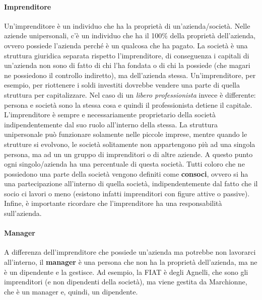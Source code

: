 \paragraph*{Imprenditore} Un'imprenditore è un individuo che ha la
proprietà di un'azienda/società. Nelle aziende unipersonali, c'è un individuo
che ha il 100\% della proprietà dell'azienda, ovvero possiede l'azienda perché
è un qualcosa che ha pagato. La società è una struttura giuridica separata
rispetto l'imprenditore, di conseguenza i capitali di un'azienda non sono di
fatto di chi l'ha fondata o di chi la possiede (che magari ne possiedono il
controllo indiretto), ma dell'azienda stessa. Un'imprenditore, per esempio, per
riottenere i soldi investiti dovrebbe vendere una parte di quella struttura per
capitalizzare. Nel caso di un \textit{libero professionista} invece è
differente: persona e società sono la stessa cosa e quindi il professionista
detiene il capitale. L'imprenditore è sempre e necessariamente proprietario
della società indipendentemente dal suo ruolo all'interno della stessa.
La struttura unipersonale può funzionare solamente nelle piccole imprese,
mentre quando le strutture si evolvono, le società solitamente non appartengono
più ad una singola persona, ma ad un un gruppo di imprenditori o di altre
aziende. A questo punto ogni singolo/azienda ha una percentuale di questa
società. Tutti coloro che ne possiedono una parte della società vengono
definiti come \textbf{consoci}, ovvero si ha una partecipazione all'interno di
quella società, indipendentemente dal fatto che il socio ci lavori o meno
(esistono infatti imprenditori con figure attive o passive). Infine, è
importante ricordare che l'imprenditore ha una responsabilità sull'azienda.

\paragraph*{Manager} A differenza dell'imprenditore che possiede un'azienda ma
potrebbe non lavorarci all'interno, il \textbf{manager} è una persona che non ha
la proprietà dell'azienda, ma ne è un dipendente e la gestisce.
Ad esempio, la FIAT è degli Agnelli, che sono gli imprenditori (e non
dipendenti della società), ma viene gestita da Marchionne, che è un manager e,
quindi, un dipendente.

